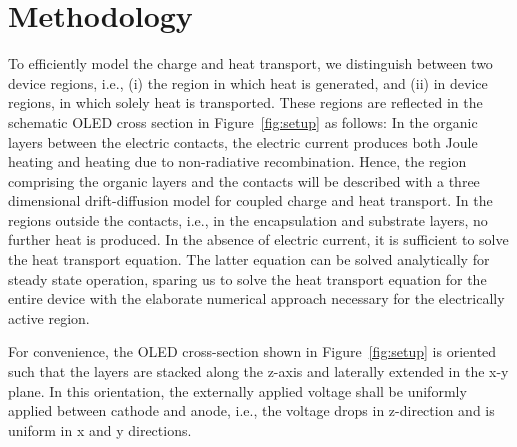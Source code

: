 \documentclass[%
9pt,
 aip,
rsi,%
 amsmath,amssymb,
preprint,%
]{revtex4-1}
\begin{document}
\section{Methodology}

To efficiently model the charge and heat transport, we distinguish between two device regions, i.e., (i) the region in which heat is generated, and (ii) in device regions, in which solely heat is transported. 
These regions are reflected in the schematic OLED cross section in Figure~\ref{fig:setup} as follows:
In the organic layers between the electric contacts, the electric current produces both Joule heating and heating due to non-radiative recombination. 
Hence, the region comprising the organic layers and the contacts will be described with a three dimensional drift-diffusion model for coupled charge and heat transport.
In the regions outside the contacts, i.e., in the encapsulation and substrate layers, no further heat is produced. 
In the absence of electric current, it is sufficient to solve the heat transport equation.
The latter equation can be solved analytically for steady state operation, sparing us to solve the heat transport equation for the entire device with the  elaborate numerical approach necessary for the electrically active region.

For convenience, the OLED cross-section shown in Figure~\ref{fig:setup} is oriented such that the layers are stacked along the z-axis and laterally extended in the x-y plane.
In this orientation, the externally applied voltage shall be uniformly applied between cathode and anode, i.e., the voltage drops in z-direction and is uniform in x and y directions.
\end{document}
